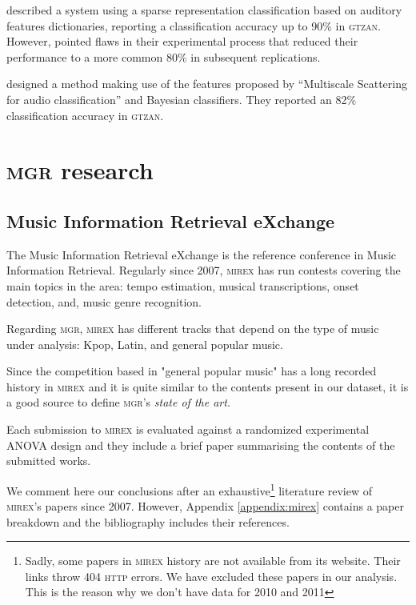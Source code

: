 \citet{best61} described a system using a sparse representation classification based on auditory features dictionaries, reporting a classification accuracy up to 90\% in \textsc{gtzan}. However, \citet{accuracy} pointed flaws in their experimental process that reduced their performance to a more common 80\% in subsequent replications.

\citet{mallat} designed a method making use of the features proposed by “Multiscale Scattering for audio classification” and Bayesian classifiers. They reported an 82\% classification accuracy in \textsc{gtzan}.

\section{\textsc{\textsc{mgr}} research}

\subsection{Music Information Retrieval eXchange}

The Music Information Retrieval eXchange is the reference conference in Music Information Retrieval. Regularly since 2007, \textsc{mirex} has run contests covering the main topics in the area: tempo estimation, musical transcriptions, onset detection, and, music genre recognition.

Regarding \textsc{\textsc{mgr}}, \textsc{mirex} has different tracks that depend on the type of music under analysis: Kpop, Latin, and general popular music.

Since the competition based in "general popular music" has a long recorded history in \textsc{mirex} and it is quite similar to the contents present in our dataset, it is a good source to define \textsc{\textsc{mgr}}'s {\it state of the art.}

Each submission to \textsc{mirex} is evaluated against a randomized experimental ANOVA design and they include a brief paper summarising the contents of the submitted works.

We comment here our conclusions after an exhaustive\footnote{Sadly, some papers in \textsc{mirex} history are not available from its website. Their links throw 404 \textsc{http} errors. We have excluded these papers in our analysis. This is the reason why we don't have data for 2010 and 2011} literature review of \textsc{mirex}'s papers since 2007. However, Appendix \ref{appendix:mirex} contains a paper breakdown and the bibliography includes their references.

